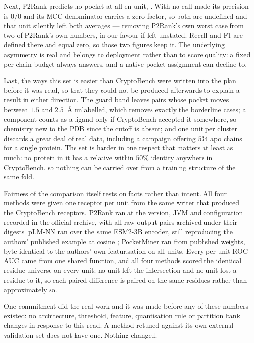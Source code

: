 \documentclass[11pt]{article}
\begin{document}
Next, P2Rank predicts no pocket at all on \ExtAbstain{} unit, \ExtAbstainUnit{}.
With no call made its precision is \(0/0\) and its MCC denominator carries a zero
factor, so both are undefined and that unit silently left both averages ---
removing P2Rank's own worst case from two of P2Rank's own numbers, in our favour
if left unstated. Recall and F1 are defined there and equal zero, so those two
figures keep it. The underlying asymmetry is real and belongs to deployment
rather than to score quality: a fixed per-chain budget always answers, and a
native pocket assignment can decline to.

Last, the ways this set is easier than CryptoBench were written into the plan
before it was read, so that they could not be produced afterwards to explain a
result in either direction. The guard band leaves pairs whose pocket moves
between \(1.5\) and \(2.5\)~\AA{} unlabelled, which removes exactly the
borderline cases; a component counts as a ligand only if CryptoBench accepted it
somewhere, so chemistry new to the PDB since the cutoff is absent; and one unit
per cluster discards a great deal of real data, including a campaign offering
\(534\) apo chains for a single protein. The set is harder in one respect that
matters at least as much: no protein in it has a relative within \(50\%\)
identity anywhere in CryptoBench, so nothing can be carried over from a training
structure of the same fold.

Fairness of the comparison itself rests on facts rather than intent. All four
methods were given one receptor per unit from the same writer that produced the
CryptoBench receptors. P2Rank ran at the version, JVM and configuration recorded
in the official archive, with all \ExtN{} raw output pairs archived under their
digests. pLM-NN ran over the same ESM2-3B encoder, still reproducing the authors'
published example at cosine \PlmFidelity{}; PocketMiner ran from published
weights, byte-identical to the authors' own featurisation on all \ExtN{} units.
Every per-unit ROC-AUC came from one shared function, and all four methods scored
the identical residue universe on every unit: no unit left the intersection and
no unit lost a residue to it, so each paired difference is paired on the same
residues rather than approximately so.

One commitment did the real work and it was made before any of these numbers
existed: no architecture, threshold, feature, quantisation rule or partition bank
changes in response to this read. A method retuned against its own external
validation set does not have one. Nothing changed.
\end{document}

